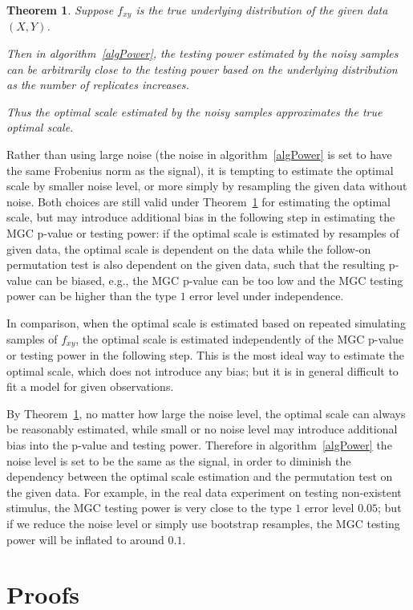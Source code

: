 \documentclass[11pt]{article}
\newtheorem{thm}{Theorem}
\begin{document}
\begin{thm}
\label{thm4}
Suppose $f_{xy}$ is the true underlying distribution of the given data $(X,Y)$.

Then in algorithm~\ref{algPower}, the testing power estimated by the noisy samples can be arbitrarily close to the testing power based on the underlying distribution as the number of replicates increases.

Thus the optimal scale estimated by the noisy samples approximates the true optimal scale.
\end{thm}

Rather than using large noise (the noise in algorithm~\ref{algPower} is set to have the same Frobenius norm as the signal), it is tempting to estimate the optimal scale by smaller noise level, or more simply by resampling the given data without noise. Both choices are still valid under Theorem~\ref{thm4} for estimating the optimal scale, but may introduce additional bias in the following step in estimating the MGC p-value or testing power: if the optimal scale is estimated by resamples of given data, the optimal scale is dependent on the data while the follow-on permutation test is also dependent on the given data, such that the resulting p-value can be biased, e.g., the MGC p-value can be too low and the MGC testing power can be higher than the type $1$ error level under independence.

In comparison, when the optimal scale is estimated based on repeated simulating samples of $f_{xy}$, the optimal scale is estimated independently of the MGC p-value or testing power in the following step. This is the most ideal way to estimate the optimal scale, which does not introduce any bias; but it is in general difficult to fit a model for given observations.

By Theorem~\ref{thm4}, no matter how large the noise level, the optimal scale can always be reasonably estimated, while small or no noise level may introduce additional bias into the p-value and testing power. Therefore in algorithm~\ref{algPower} the noise level is set to be the same as the signal, in order to diminish the dependency between the optimal scale estimation and the permutation test on the given data. For example, in the real data experiment on testing non-existent stimulus, the MGC testing power is very close to the type $1$ error level $0.05$; but if we reduce the noise level or simply use bootstrap resamples, the MGC testing power will be inflated to around $0.1$. 

\section{Proofs}
\label{appen:proofs}
\end{document}
